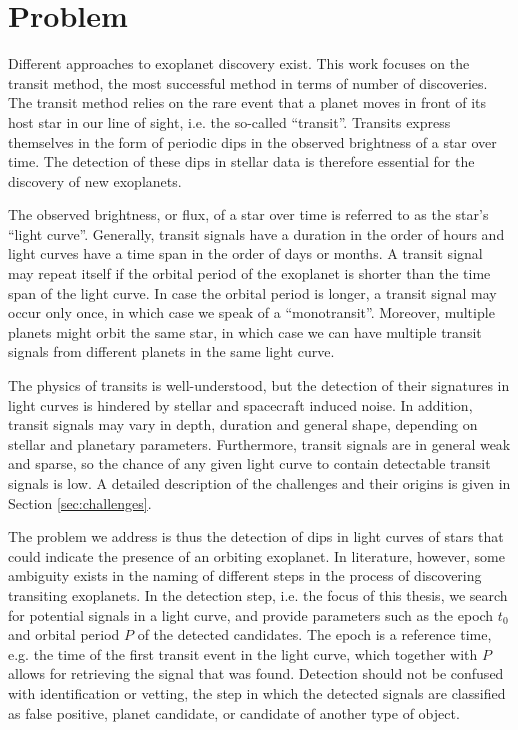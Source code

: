 
\section{Problem}
\label{sec:problem}

Different approaches to exoplanet discovery exist. This work focuses on the transit method, the most successful method in terms of number of discoveries. The transit method relies on the rare event that a planet moves in front of its host star in our line of sight, i.e. the so-called ``transit''. Transits express themselves in the form of periodic dips in the observed brightness of a star over time. The detection of these dips in stellar data is therefore essential for the discovery of new exoplanets. 

The observed brightness, or flux, of a star over time is referred to as the star's ``light curve''. Generally, transit signals have a duration in the order of hours and light curves have a time span in the order of days or months. A transit signal may repeat itself if the orbital period of the exoplanet is shorter than the time span of the light curve.
In case the orbital period is longer, a transit signal may occur only once, in which case we speak of a ``monotransit''. 
Moreover, multiple planets might orbit the same star, in which case we can have multiple transit signals from different planets in the same light curve.

The physics of transits is well-understood, but the detection of their signatures in light curves is hindered by stellar and spacecraft induced noise. 
In addition, transit signals may vary in depth, duration and general shape, depending on stellar and planetary parameters.
Furthermore, transit signals are in general weak and sparse, so the chance of any given light curve to contain detectable transit signals is low. A detailed description of the challenges and their origins is given in Section \ref{sec:challenges}.

The problem we address is thus the detection of dips in light curves of stars that could indicate the presence of an orbiting exoplanet. In literature, however, some ambiguity exists in the naming of different steps in the process of discovering transiting exoplanets. In the detection step, i.e. the focus of this thesis, we search for potential signals in a light curve, and provide parameters such as the epoch $t_0$ and orbital period $P$ of the detected candidates. The epoch is a reference time, e.g. the time of the first transit event in the light curve, which together with $P$ allows for retrieving the signal that was found. Detection should not be confused with identification or vetting, the step in which the detected signals are classified as false positive, planet candidate, or candidate of another type of object.
